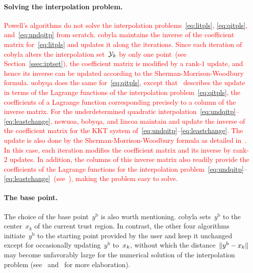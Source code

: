 \documentclass[
    smallextended,  %
    draft,          %
]{svjour3}
\newcommand{\base}{{\text{b}}}
\newcommand{\iter}[1][k]{x\ifthenelse{\equal{#1}{}}{}{_{#1}}}
\newcommand{\xpt}[1][k]{\mathcal{Y}\ifthenelse{\equal{#1}{}}{}{_{#1}}}
\newcommand{\red}{\textcolor{red}}
\begin{document}
\paragraph{Solving the interpolation problem.}
\red{
Powell's algorithms do not solve the interpolation problems~\eqref{eq:litpls}, \eqref{eq:qitpls}, and~\eqref{eq:undqitp} from scratch.
\gls{cobyla} maintains the inverse of the coefficient matrix for~\eqref{eq:litpls}
and updates it along the iterations.
Since each iteration of \gls{cobyla} alters the interpolation set~$\xpt$ by only one
point~(see Section~\ref{ssec:iptset}), the coefficient matrix is modified by a rank-$1$ update, and hence
its inverse can be updated according to the Sherman-Morrison-Woodbury formula.
\gls{uobyqa} does the same for~\eqref{eq:qitpls},
except that~\cite[\S~4]{Powell_2002} describes the update in terms of the Lagrange functions of the
interpolation problem~\eqref{eq:qitpls}, the coefficients of a Lagrange function corresponding
precisely to a column of the inverse matrix.
For the underdetermined quadratic interpolation~\eqref{eq:undqitp}--\eqref{eq:leastchange},
\gls{newuoa}, \gls{bobyqa}, and \gls{lincoa}
maintain and update the inverse of the coefficient matrix for the KKT system
of~\eqref{eq:undqitp}--\eqref{eq:leastchange}. The update is also done by the
Sherman-Morrison-Woodbury formula as detailed in~\cite[\S~2]{Powell_2004c}. In this case, each
iteration modifies the coefficient matrix and its inverse by rank-$2$ updates.
In addition, the columns of this inverse matrix also readily provide the coefficients of the Lagrange
functions for the interpolation problem~\eqref{eq:undqitp}--\eqref{eq:leastchange}~(see~\cite[\S~3]{Powell_2004b}), making the problem easy to solve.
}

\paragraph{The base point.}

The choice of the base point~$y^{\base}$ is also worth mentioning.
\Gls{cobyla} sets~$y^{\base}$ to the center~$x_k$ of the current trust region.
In contrast, the other four algorithms initiate~$y^{\base}$ to the starting point provided by the
user and keep it unchanged except for occasionally updating~$y^{\base}$ to~$\iter$, without which
the distance~$\|y^{\base}-\iter\|$ may become unfavorably large for the numerical solution of the
interpolation problem (see~\cite[\S~5]{Powell_2004b} and~\cite[\S~7]{Powell_2006} for more elaboration).
\end{document}
